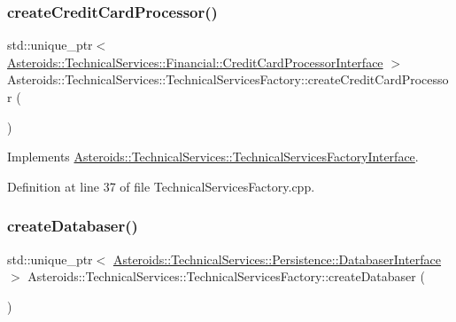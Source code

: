 \subsubsection{\texorpdfstring{create\+Credit\+Card\+Processor()}{createCreditCardProcessor()}}
{\footnotesize\ttfamily std\+::unique\+\_\+ptr$<$ \hyperlink{classAsteroids_1_1TechnicalServices_1_1Financial_1_1CreditCardProcessorInterface}{Asteroids\+::\+Technical\+Services\+::\+Financial\+::\+Credit\+Card\+Processor\+Interface} $>$ Asteroids\+::\+Technical\+Services\+::\+Technical\+Services\+Factory\+::create\+Credit\+Card\+Processor (\begin{DoxyParamCaption}{ }\end{DoxyParamCaption})\hspace{0.3cm}{\ttfamily [virtual]}}



Implements \hyperlink{classAsteroids_1_1TechnicalServices_1_1TechnicalServicesFactoryInterface_afe781f2df87f128a9aaae9c0375277d3}{Asteroids\+::\+Technical\+Services\+::\+Technical\+Services\+Factory\+Interface}.



Definition at line 37 of file Technical\+Services\+Factory.\+cpp.

\mbox{\label{classAsteroids_1_1TechnicalServices_1_1TechnicalServicesFactory_a86d467c90df00dd759aae317a7d75e57}} 
\subsubsection{\texorpdfstring{create\+Databaser()}{createDatabaser()}}
{\footnotesize\ttfamily std\+::unique\+\_\+ptr$<$ \hyperlink{classAsteroids_1_1TechnicalServices_1_1Persistence_1_1DatabaserInterface}{Asteroids\+::\+Technical\+Services\+::\+Persistence\+::\+Databaser\+Interface} $>$ Asteroids\+::\+Technical\+Services\+::\+Technical\+Services\+Factory\+::create\+Databaser (\begin{DoxyParamCaption}{ }\end{DoxyParamCaption})\hspace{0.3cm}{\ttfamily [virtual]}}

